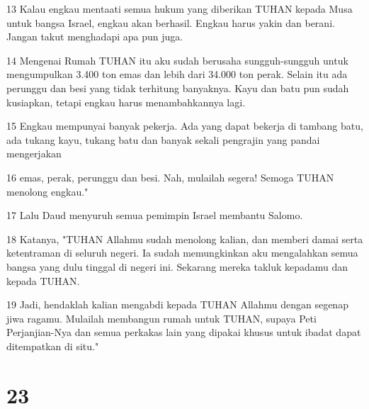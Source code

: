 \par 13 Kalau engkau mentaati semua hukum yang diberikan TUHAN kepada Musa untuk bangsa Israel, engkau akan berhasil. Engkau harus yakin dan berani. Jangan takut menghadapi apa pun juga.
\par 14 Mengenai Rumah TUHAN itu aku sudah berusaha sungguh-sungguh untuk mengumpulkan 3.400 ton emas dan lebih dari 34.000 ton perak. Selain itu ada perunggu dan besi yang tidak terhitung banyaknya. Kayu dan batu pun sudah kusiapkan, tetapi engkau harus menambahkannya lagi.
\par 15 Engkau mempunyai banyak pekerja. Ada yang dapat bekerja di tambang batu, ada tukang kayu, tukang batu dan banyak sekali pengrajin yang pandai mengerjakan
\par 16 emas, perak, perunggu dan besi. Nah, mulailah segera! Semoga TUHAN menolong engkau."
\par 17 Lalu Daud menyuruh semua pemimpin Israel membantu Salomo.
\par 18 Katanya, "TUHAN Allahmu sudah menolong kalian, dan memberi damai serta ketentraman di seluruh negeri. Ia sudah memungkinkan aku mengalahkan semua bangsa yang dulu tinggal di negeri ini. Sekarang mereka takluk kepadamu dan kepada TUHAN.
\par 19 Jadi, hendaklah kalian mengabdi kepada TUHAN Allahmu dengan segenap jiwa ragamu. Mulailah membangun rumah untuk TUHAN, supaya Peti Perjanjian-Nya dan semua perkakas lain yang dipakai khusus untuk ibadat dapat ditempatkan di situ."

\chapter{23}

